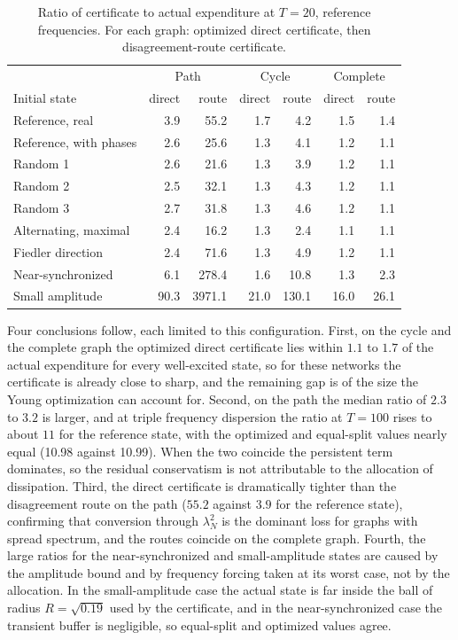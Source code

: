 \documentclass[11pt,notitlepage]{report}
\theoremstyle{definition}
\theoremstyle{remark}
\begin{document}
\begin{table}[ht]\centering\small
\caption{Ratio of certificate to actual expenditure at $T=20$, reference frequencies. For each graph: optimized direct certificate, then disagreement-route certificate.}
\begin{tabular}{lrrrrrr}\toprule
&\multicolumn{2}{c}{Path}&\multicolumn{2}{c}{Cycle}&\multicolumn{2}{c}{Complete}\\
Initial state&direct&route&direct&route&direct&route\\\midrule
Reference, real&3.9&55.2&1.7&4.2&1.5&1.4\\
Reference, with phases&2.6&25.6&1.3&4.1&1.2&1.1\\
Random 1&2.6&21.6&1.3&3.9&1.2&1.1\\
Random 2&2.5&32.1&1.3&4.3&1.2&1.1\\
Random 3&2.7&31.8&1.3&4.6&1.2&1.1\\
Alternating, maximal&2.4&16.2&1.3&2.4&1.1&1.1\\
Fiedler direction&2.4&71.6&1.3&4.9&1.2&1.1\\
Near-synchronized&6.1&278.4&1.6&10.8&1.3&2.3\\
Small amplitude&90.3&3971.1&21.0&130.1&16.0&26.1\\\bottomrule
\end{tabular}
\end{table}
Four conclusions follow, each limited to this configuration. First, on the cycle and the complete graph the optimized direct certificate lies within $1.1$ to $1.7$ of the actual expenditure for every well-excited state, so for these networks the certificate is already close to sharp, and the remaining gap is of the size the Young optimization can account for. Second, on the path the median ratio of $2.3$ to $3.2$ is larger, and at triple frequency dispersion the ratio at $T=100$ rises to about $11$ for the reference state, with the optimized and equal-split values nearly equal (10.98 against 10.99). When the two coincide the persistent term dominates, so the residual conservatism is not attributable to the allocation of dissipation. Third, the direct certificate is dramatically tighter than the disagreement route on the path ($55.2$ against $3.9$ for the reference state), confirming that conversion through $\lambda_N^2$ is the dominant loss for graphs with spread spectrum, and the routes coincide on the complete graph. Fourth, the large ratios for the near-synchronized and small-amplitude states are caused by the amplitude bound and by frequency forcing taken at its worst case, not by the allocation. In the small-amplitude case the actual state is far inside the ball of radius $R=\sqrt{0.19}$ used by the certificate, and in the near-synchronized case the transient buffer is negligible, so equal-split and optimized values agree.
\end{document}
